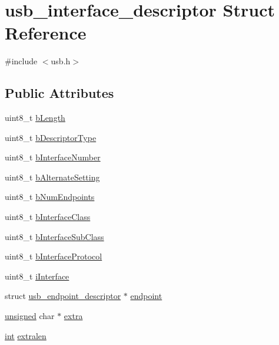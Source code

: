 \hypertarget{structusb__interface__descriptor}{\section{usb\-\_\-interface\-\_\-descriptor Struct Reference}
\label{structusb__interface__descriptor}
}


{\ttfamily \#include $<$usb.\-h$>$}

\subsection*{Public Attributes}
\begin{DoxyCompactItemize}
\item 
uint8\-\_\-t \hyperlink{structusb__interface__descriptor_a7959ad865fb5527dba879ded533f5976}{b\-Length}
\item 
uint8\-\_\-t \hyperlink{structusb__interface__descriptor_a757761276c9053ed877cee89cba167ea}{b\-Descriptor\-Type}
\item 
uint8\-\_\-t \hyperlink{structusb__interface__descriptor_aea613784e25f453d059635a8d292a249}{b\-Interface\-Number}
\item 
uint8\-\_\-t \hyperlink{structusb__interface__descriptor_aacc6f1a4e77883f97ffb0453e41c5b10}{b\-Alternate\-Setting}
\item 
uint8\-\_\-t \hyperlink{structusb__interface__descriptor_a1fa779eda460fd7f670f7e1adeceed94}{b\-Num\-Endpoints}
\item 
uint8\-\_\-t \hyperlink{structusb__interface__descriptor_acccd957d6f023f3d4701abd491c45cf6}{b\-Interface\-Class}
\item 
uint8\-\_\-t \hyperlink{structusb__interface__descriptor_ac807fb07b6b89886836ad5c1253dae82}{b\-Interface\-Sub\-Class}
\item 
uint8\-\_\-t \hyperlink{structusb__interface__descriptor_a177ebd30941b905658e1f89654d320c2}{b\-Interface\-Protocol}
\item 
uint8\-\_\-t \hyperlink{structusb__interface__descriptor_a63008abbea76cc397836554747386055}{i\-Interface}
\item 
struct \hyperlink{structusb__endpoint__descriptor}{usb\-\_\-endpoint\-\_\-descriptor} $\ast$ \hyperlink{structusb__interface__descriptor_ac93862acb4427d16b1825734c474aeaa}{endpoint}
\item 
\hyperlink{curses_8priv_8h_aca40206900cfc164654362fa8d4ad1e6}{unsigned} char $\ast$ \hyperlink{structusb__interface__descriptor_a3f091168899d53afd7669306893b5735}{extra}
\item 
\hyperlink{term__entry_8h_ad65b480f8c8270356b45a9890f6499ae}{int} \hyperlink{structusb__interface__descriptor_ac0a7dff17ffc27fbab51c6c3da13bc8b}{extralen}
\end{DoxyCompactItemize}


